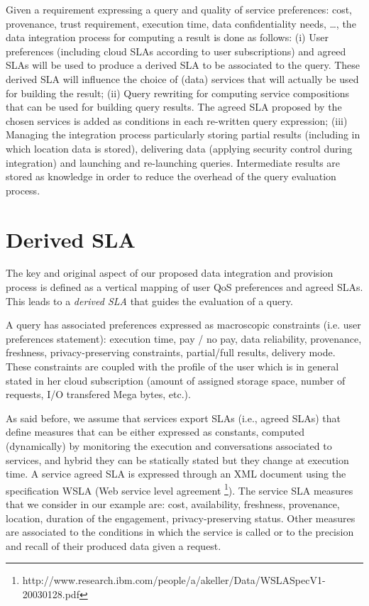 Given a requirement expressing a query and quality of service preferences: cost, provenance, trust requirement, execution time, data confidentiality needs, \dots, the data integration process for computing a result is done as follows: (i) User preferences (including cloud SLAs according to user subscriptions) and agreed SLAs will be used to produce a derived SLA to be associated to the query. 
These derived SLA will influence the choice of (data) services that will actually be used for building the result; (ii) Query rewriting for computing service compositions that can be used for  building query results. The agreed SLA proposed by the chosen services is added as  conditions in  each re-written   query expression; (iii) Managing the integration process particularly storing partial results (including in  which location data is stored), delivering data (applying security control during integration) and launching and re-launching queries. Intermediate results  are stored as knowledge in order to reduce the overhead of the query evaluation process. 

 
\section{Derived SLA}
\label{sec:slaModel}

The key and original aspect of   our proposed data integration and provision process is  defined as a vertical mapping of user QoS preferences and agreed SLAs. This  leads to a {\em derived SLA} that guides the evaluation of a query. 

A query has associated preferences  expressed as macroscopic constraints (i.e. user preferences statement): execution time, pay / no pay, data reliability, provenance, freshness, privacy-preserving constraints, partial/full results, delivery mode. These constraints are coupled with the profile of the user which is in general stated in her cloud subscription (amount of assigned storage space, number of requests, I/O transfered Mega bytes, etc.). 

As said before, we assume that services export SLAs (i.e., agreed SLAs) that define measures   that can be either expressed as constants,  computed (dynamically) by monitoring the execution and conversations associated to services, and hybrid they can be statically stated  but they change at execution time.  A service  agreed SLA is expressed through an  XML document using the specification WSLA (Web service level agreement \footnote{\footnotesize http://www.research.ibm.com/people/a/akeller/\-Data/WSLASpecV1-20030128.pdf}). The service SLA measures  that we consider in our example are: cost, availability, freshness, provenance, location, duration of the engagement, privacy-preserving status. Other measures are associated to the conditions in which the service is called or to the precision and recall of their produced data given a request. 

